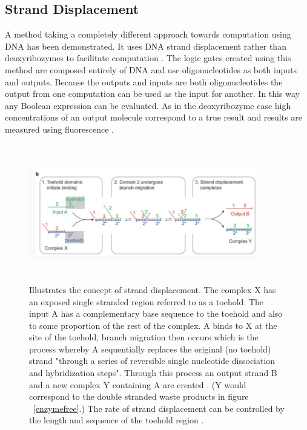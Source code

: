\documentclass[11pt,a4paper,portrait]{article}
\begin{document}
\clearpage
\subsection{Strand Displacement}
A method taking a completely different approach towards computation using DNA has been demonstrated. It uses DNA strand displacement rather than deoxyribozymes to facilitate computation \cite{enzymefree}. The logic gates created using this method are composed entirely of DNA and use oligonucleotides as both inputs and outputs. Because the outputs and inputs are both oligonucleotides the output from one computation can be used as the input for another. In this way any Boolean expression can be evaluated. As in the deoxyribozyme case high concentrations of an output molecule correspond to a true result and results are measured using fluorescence \cite{enzymefree}.

\begin{figure}[ht!]
\centering
\includegraphics[width=100mm, height=60mm]{stranddisplacement.png}
\caption{Illustrates the concept of strand displacement. The complex X has an exposed single stranded region referred to as a toehold. The input A has a complementary base sequence to the toehold and also to some proportion of the rest of the complex. A binds to X at the site of the toehold, branch migration then occurs which is the process whereby A sequentially replaces the original (no toehold) strand "through a series of reversible single nucleotide dissociation and hybridization steps". Through this process an output strand B and a new complex Y containing A are created \cite{stranddisplacement}. (Y would correspond to the double stranded waste products in figure ~\ref{enzymefree}.) The rate of strand displacement can be controlled by the length and sequence of the toehold region \cite{stranddisplacement}. \label{stranddisplacement}}
\end{figure}
\end{document}
